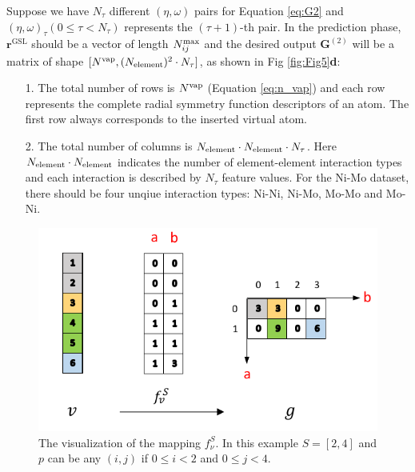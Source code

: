\documentclass[preprint]{revtex4-2}
\begin{document}
Suppose we have $N_{\tau}$ different $(\eta, \omega)$ pairs for Equation 
\ref{eq:G2} and $(\eta, \omega)_{\tau} (0 \le \tau < N_{\tau})$ represents the 
$(\tau+1)$-th pair. In the prediction phase, $\mathbf{r}^{\mathrm{GSL}}$ should 
be a vector of length $N_{ij}^{\mathrm{max}}$ and the desired output $\mathbf{G}^{(2)}$ will 
be a matrix of shape $[N^{\mathrm{vap}}, (N_{\mathrm{element}})^2 \cdot N_{\tau}]$, as shown in 
Fig \ref{fig:Fig5}\textbf{d}:
\begin{itemize}
    
    \item[1.] 
    The total number of rows is $N^{\mathrm{vap}}$ (Equation \ref{eq:n_vap}) and each row
    represents the complete radial symmetry function descriptors of an atom. The 
    first row always corresponds to the inserted virtual atom.
    
    \item[2.]
    The total number of columns is $N_{\mathrm{element}} \cdot N_{\mathrm{element}} \cdot N_{\tau}$. Here 
    $N_{\mathrm{element}} \cdot N_{\mathrm{element}}$ indicates the number of element-element interaction types 
    and each interaction is described by $N_{\tau}$ feature values. For the 
    Ni-Mo dataset, there should be four unqiue interaction types: Ni-Ni, Ni-Mo, 
    Mo-Mo and Mo-Ni.

\end{itemize}

% 
%
\begin{figure}[h!]
\centering
\includegraphics[scale=1.0]{figures/Fig4.pdf}
\caption{\label{fig:Fig4} The visualization of the mapping $f^S_{\nu}$.
In this example $S = [2,4]$ and $p$ can be any $(i,j)$ if 
$0 \le i < 2$ and $0 \le j < 4$.
}
\end{figure}
\end{document}
